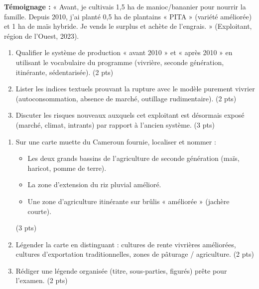 \documentclass[11pt]{article}
\begin{document}
\begin{exercice}
\textbf{Témoignage :} « Avant, je cultivais 1,5 ha de manioc/bananier pour nourrir la famille. Depuis 2010, j'ai planté 0,5 ha de plantains « PITA » (variété améliorée) et 1 ha de maïs hybride. Je vends le surplus et achète de l'engrais. » (Exploitant, région de l'Ouest, 2023).
\begin{enumerate}
    \item Qualifier le système de production « avant 2010 » et « après 2010 » en utilisant le vocabulaire du programme (vivrière, seconde génération, itinérante, sédentarisée). (2 pts)
    \item Lister les indices textuels prouvant la rupture avec le modèle purement vivrier (autoconsommation, absence de marché, outillage rudimentaire). (2 pts)
    \item Discuter les risques nouveaux auxquels cet exploitant est désormais exposé (marché, climat, intrants) par rapport à l'ancien système. (3 pts)
\end{enumerate}
\end{exercice}

\begin{exercice}
\begin{enumerate}
    \item Sur une carte muette du Cameroun fournie, localiser et nommer : 
    \begin{itemize}
        \item Les deux grands bassins de l'agriculture de seconde génération (maïs, haricot, pomme de terre).
        \item La zone d'extension du riz pluvial amélioré.
        \item Une zone d'agriculture itinérante sur brûlis « améliorée » (jachère courte).
    \end{itemize}
    (3 pts)
    \item Légender la carte en distinguant : cultures de rente vivrières améliorées, cultures d'exportation traditionnelles, zones de pâturage / agriculture. (2 pts)
    \item Rédiger une légende organisée (titre, sous-parties, figurés) prête pour l'examen. (2 pts)
\end{enumerate}
\end{exercice}
\end{document}
